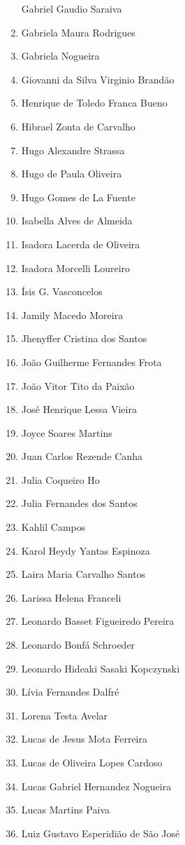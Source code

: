 \documentclass[
  letterpaper,
  DIV=11,
  numbers=noendperiod]{scrreprt}
\begin{document}
\begin{enumerate}
  Gabriel Gaudio Saraiva
\item
  Gabriela Maura Rodrigues
\item
  Gabriela Nogueira
\item
  Giovanni da Silva Virginio Brandão
\item
  Henrique de Toledo Franca Bueno
\item
  Hibrael Zonta de Carvalho
\item
  Hugo Alexandre Strassa
\item
  Hugo de Paula Oliveira
\item
  Hugo Gomes de La Fuente
\item
  Isabella Alves de Almeida
\item
  Isadora Lacerda de Oliveira
\item
  Isadora Morcelli Loureiro
\item
  Ísis G. Vasconcelos
\item
  Jamily Macedo Moreira
\item
  Jhenyffer Cristina dos Santos
\item
  João Guilherme Fernandes Frota
\item
  João Vitor Tito da Paixão
\item
  José Henrique Lessa Vieira
\item
  Joyce Soares Martins
\item
  Juan Carlos Rezende Canha
\item
  Julia Coqueiro Ho
\item
  Julia Fernandes dos Santos
\item
  Kahlil Campos
\item
  ⁠Karol Heydy Yantas Espinoza
\item
  Laira Maria Carvalho Santos
\item
  Larissa Helena Franceli
\item
  Leonardo Basset Figueiredo Pereira
\item
  Leonardo Bonfá Schroeder
\item
  Leonardo Hideaki Sasaki Kopczynski
\item
  Lívia Fernandes Dalfré
\item
  Lorena Testa Avelar
\item
  Lucas de Jesus Mota Ferreira
\item
  Lucas de Oliveira Lopes Cardoso
\item
  Lucas Gabriel Hernandez Nogueira
\item
  Lucas Martins Paiva
\item
  Luiz Gustavo Esperidião de São José

\end{enumerate}
\end{document}
